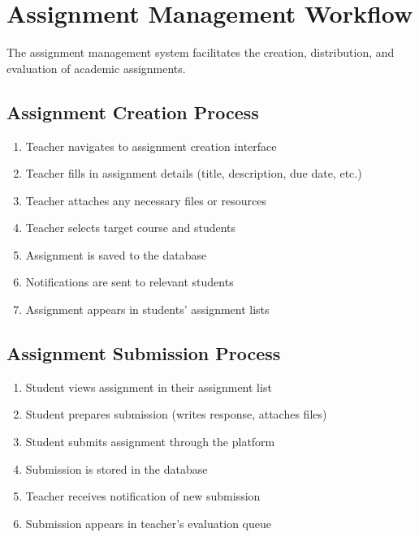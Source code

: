 \section{Assignment Management Workflow}

The assignment management system facilitates the creation, distribution, and evaluation of academic assignments.

\subsection{Assignment Creation Process}

\begin{enumerate}
    \item Teacher navigates to assignment creation interface
    \item Teacher fills in assignment details (title, description, due date, etc.)
    \item Teacher attaches any necessary files or resources
    \item Teacher selects target course and students
    \item Assignment is saved to the database
    \item Notifications are sent to relevant students
    \item Assignment appears in students' assignment lists
\end{enumerate}

\subsection{Assignment Submission Process}

\begin{enumerate}
    \item Student views assignment in their assignment list
    \item Student prepares submission (writes response, attaches files)
    \item Student submits assignment through the platform
    \item Submission is stored in the database
    \item Teacher receives notification of new submission
    \item Submission appears in teacher's evaluation queue
\end{enumerate}

